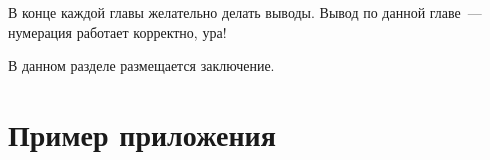 \documentclass[annotation,times,page4]{itmo-student-thesis}
\begin{document}
\chapterconclusion

В конце каждой главы желательно делать выводы. Вывод по данной главе~--- нумерация работает корректно, ура!

\startconclusionpage

В данном разделе размещается заключение.

\printbibliography[heading=trueHeading]

\appendix

\chapter{Пример приложения}
\end{document}
